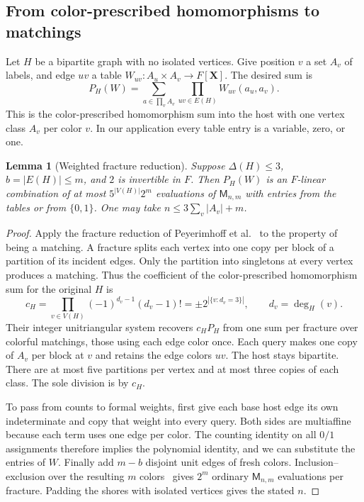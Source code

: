 \documentclass[11pt]{article}
\newtheorem{lemma}[theorem]{Lemma}
\theoremstyle{remark}
\newcommand{\Match}{\mathsf M}
\begin{document}
\subsection{From color-prescribed homomorphisms to matchings}
Let \(H\) be a bipartite graph with no isolated vertices. Give position \(v\) a set \(A_v\) of labels, and edge \(uv\) a table \(W_{uv}:A_u\times A_v\to F[\mathbf X]\). The desired sum is
\[
 P_H(W)=\sum_{a\in\prod_v A_v}\prod_{uv\in E(H)} W_{uv}(a_u,a_v).
\]
This is the color-prescribed homomorphism sum into the host with one vertex class $A_v$ per color $v$. In our application every table entry is a variable, zero, or one.
\begin{lemma}[Weighted fracture reduction]\label{split}
Suppose \(\Delta(H)\le3\), \(b=|E(H)|\le m\), and \(2\) is invertible in \(F\).
Then \(P_H(W)\) is an \(F\)-linear combination of at most \(5^{|V(H)|}2^m\) evaluations of \(\Match_{n,m}\) with entries from the tables or from \(\{0,1\}\). One may take \(n\le 3\sum_v |A_v|+m\).
\end{lemma}
\begin{proof}
Apply the fracture reduction of Peyerimhoff et al.~\cite[Corollary~4.3 and Lemmas~4.4--4.6]{fractures} to the property of being a matching. A fracture splits each vertex into one copy per block of a partition of its incident edges. Only the partition into singletons at every vertex produces a matching. Thus the coefficient of the color-prescribed homomorphism sum for the original $H$ is
\[
 c_H=\prod_{v\in V(H)}(-1)^{d_v-1}(d_v-1)!
      =\pm 2^{|\{v:d_v=3\}|},\qquad d_v=\deg_H(v).
\]
Their integer unitriangular system recovers $c_H P_H$ from one sum per fracture over colorful matchings, those using each edge color once. Each query makes one copy of $A_v$ per block at $v$ and retains the edge colors $uv$. The host stays bipartite. There are at most five partitions per vertex and at most three copies of each class. The sole division is by $c_H$.

To pass from counts to formal weights, first give each base host edge its own indeterminate and copy that weight into every query. Both sides are multiaffine because each term uses one edge per color. The counting identity on all $0/1$ assignments therefore implies the polynomial identity, and we can substitute the entries of $W$. Finally add $m-b$ disjoint unit edges of fresh colors. Inclusion--exclusion over the resulting $m$ colors~\cite[Lemma~4.7]{fractures} gives $2^m$ ordinary $\Match_{n,m}$ evaluations per fracture. Padding the shores with isolated vertices gives the stated $n$.
\end{proof}
\end{document}
